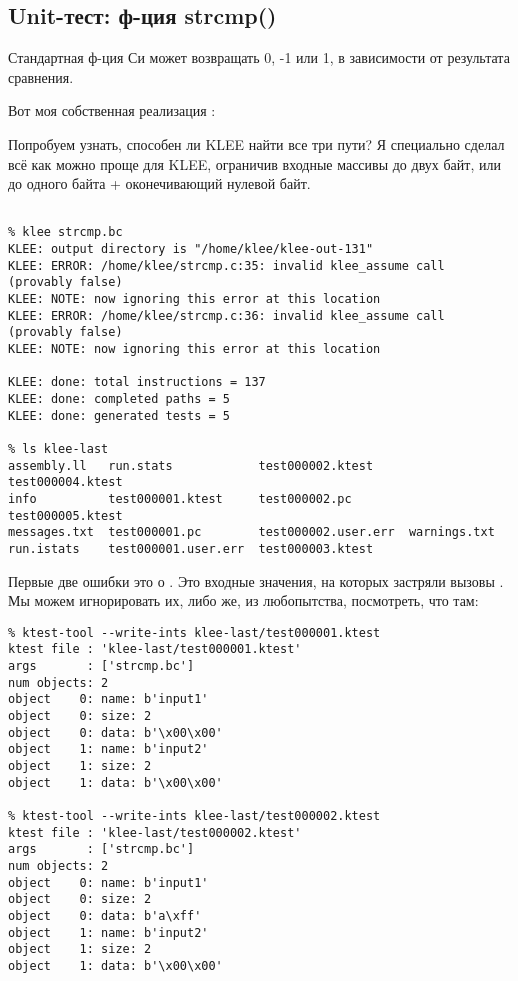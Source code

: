 \subsection{Unit-тест: ф-ция strcmp()}

Стандартная ф-ция Си  может возвращать 0, -1 или 1, в зависимости от результата сравнения.

Вот моя собственная реализация :



Попробуем узнать, способен ли KLEE найти все три пути?
Я специально сделал всё как можно проще для KLEE, ограничив входные массивы до двух байт, или до одного байта +
оконечивающий нулевой байт.

\begin{lstlisting}[basicstyle=\ttfamily, mathescape]
% clang -emit-llvm -c -g strcmp.c

% klee strcmp.bc
KLEE: output directory is "/home/klee/klee-out-131"
KLEE: ERROR: /home/klee/strcmp.c:35: invalid klee_assume call (provably false)
KLEE: NOTE: now ignoring this error at this location
KLEE: ERROR: /home/klee/strcmp.c:36: invalid klee_assume call (provably false)
KLEE: NOTE: now ignoring this error at this location

KLEE: done: total instructions = 137
KLEE: done: completed paths = 5
KLEE: done: generated tests = 5

% ls klee-last
assembly.ll   run.stats            test000002.ktest     test000004.ktest
info          test000001.ktest     test000002.pc        test000005.ktest
messages.txt  test000001.pc        test000002.user.err  warnings.txt
run.istats    test000001.user.err  test000003.ktest
\end{lstlisting}

Первые две ошибки это о .
Это входные значения, на которых застряли вызовы .
Мы можем игнорировать их, либо же, из любопытства, посмотреть, что там:

\begin{lstlisting}
% ktest-tool --write-ints klee-last/test000001.ktest
ktest file : 'klee-last/test000001.ktest'
args       : ['strcmp.bc']
num objects: 2
object    0: name: b'input1'
object    0: size: 2
object    0: data: b'\x00\x00'
object    1: name: b'input2'
object    1: size: 2
object    1: data: b'\x00\x00'

% ktest-tool --write-ints klee-last/test000002.ktest
ktest file : 'klee-last/test000002.ktest'
args       : ['strcmp.bc']
num objects: 2
object    0: name: b'input1'
object    0: size: 2
object    0: data: b'a\xff'
object    1: name: b'input2'
object    1: size: 2
object    1: data: b'\x00\x00'
\end{lstlisting}

